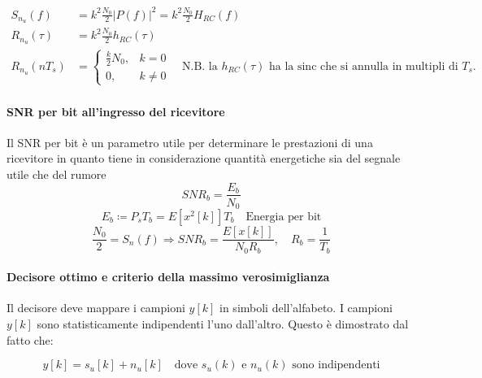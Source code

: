 \begin{enumerate}
          \begin{align*}
              S_{n_u}(f)    & = k^2 \frac{N_0}{2} |P(f)|^2 = k^2 \frac{N_0}{2} H_{RC}(f) \\
              R_{n_u}(\tau) & = k^2 \frac{N_0}{2} h_{RC}(\tau)                           \\
              R_{n_u}(nT_s) & = \begin{cases}
                                    \frac{k}{2} N_0, & k = 0    \\
                                    0,               & k \neq 0
                                \end{cases} \quad
              \text{N.B. la $h_{RC}(\tau)$ ha la sinc che si annulla in multipli di $T_s$.}
          \end{align*}

\end{enumerate}


\paragraph{SNR per bit all'ingresso del ricevitore}

Il SNR per bit è un parametro utile per determinare le prestazioni di una ricevitore in quanto tiene in considerazione quantità energetiche sia del segnale utile che del rumore
\[
    SNR_b = \frac{E_b}{N_0}
\]
\[
    E_b \coloneqq P_s T_b = E\left[x^2[k]\right]T_b \quad \text{Energia per bit} \]
\[
    \frac{N_0}{2} = S_n(f)
    \Rightarrow SNR_b = \frac{E\left[ x[k]\right]}{N_0 R_b}, \quad R_b = \frac{1}{T_b}
\]

\paragraph{Decisore ottimo e criterio della massimo verosimiglianza}

Il decisore deve mappare i campioni $y[k]$ in simboli dell'alfabeto. I campioni $y[k]$ sono statisticamente indipendenti l'uno dall'altro. Questo è dimostrato dal fatto che:

\[
    y[k] = s_u[k] + n_u[k]
    \quad
    \text{dove } s_u(k) \text{ e } n_u(k) \text{ sono indipendenti}
\]


\begin{center}
\end{center}

